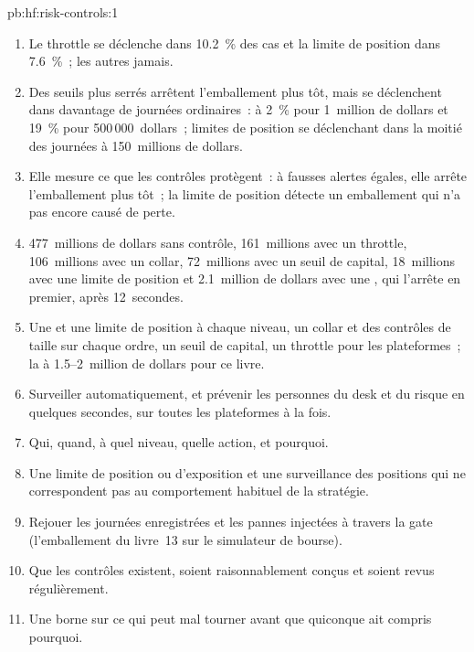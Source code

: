 \begin{solution}{pb:hf:risk-controls:1}
\begin{enumerate}
million de dollars)~; une personne à 5~minutes, 53~millions de dollars~; aucun, 477~millions de dollars.
\item Le throttle se déclenche dans 10.2~\% des cas et la limite de position dans 7.6~\%~; les autres jamais.
\item Des seuils plus serrés arrêtent l'emballement plus tôt, mais se déclenchent dans davantage de journées ordinaires~:  à 2~\% pour 1~million de dollars et 19~\% pour 500\,000~dollars~; limites de position
se déclenchant dans la moitié des journées à 150~millions de dollars.
\item Elle mesure ce que les contrôles protègent~: à fausses alertes égales, elle arrête l'emballement plus tôt~; la limite de position détecte un
emballement qui n'a pas encore causé de perte.
\item 477~millions de dollars sans contrôle, 161~millions avec un throttle, 106~millions avec un collar, 72~millions avec un seuil de capital, 18~millions avec une
limite de position et 2.1~million de dollars avec une , qui l'arrête en premier, après 12~secondes.
\item Une  et une limite de position à chaque niveau, un collar et des contrôles de taille sur chaque ordre, un seuil de capital, un throttle pour les plateformes~; la
 à 1.5--2~million de dollars pour ce livre.
\item Surveiller automatiquement, et prévenir les personnes du desk et du risque en quelques secondes, sur toutes les plateformes à la fois.
\item Qui, quand, à quel niveau, quelle action, et pourquoi.
\item Une limite de position ou d'exposition et une surveillance des positions qui ne correspondent pas au comportement habituel de la stratégie.
\item Rejouer les journées enregistrées et les pannes injectées à travers la gate (l'emballement du livre~13 sur le simulateur de bourse).
\item Que les contrôles existent, soient raisonnablement conçus et soient revus régulièrement.
\item Une borne sur ce qui peut mal tourner avant que quiconque ait compris pourquoi.
\end{enumerate}
\end{solution}

